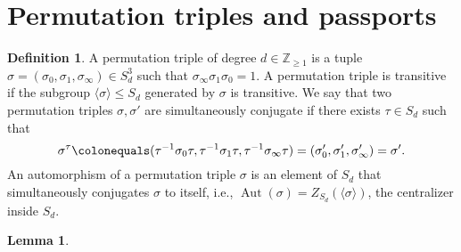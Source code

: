 \documentclass{dcthesis}
\newcommand{\PP}{\mathbb P}
\newcommand{\CC}{\mathbb C}
\newcommand{\QQ}{\mathbb Q}
\newcommand{\ZZ}{\mathbb Z}
\newcommand{\defi}[1]{\textsf{#1}}
\DeclareMathOperator{\Aut}{Aut}
\DeclareMathOperator{\Mon}{Mon}
\DeclareMathOperator{\Gal}{Gal}
\numberwithin{equation}{section}
\newtheorem{lemma}[equation]{Lemma}
\theoremstyle{definition}
\newtheorem{definition}[equation]{Definition}
\theoremstyle{remark}
\begin{document}
{  \section{Permutation triples and passports}{\label{sec:passports}
    \begin{definition}
      \label{def:permutationtriple}
      A \defi{permutation triple} of degree $d \in \ZZ_{\geq 1}$ is a tuple $\sigma =
      (\sigma_0,\sigma_1,\sigma_\infty)\in S_d^3$ such that $\sigma_\infty \sigma_1
      \sigma_0 = 1$.
      A permutation triple is \defi{transitive} if the subgroup
      $\langle \sigma \rangle \leq S_d$ generated by $\sigma$ is transitive.
      We say
      that two permutation triples $\sigma,\sigma'$ are \defi{simultaneously
      conjugate} if there exists $\tau\in S_d$ such that
      \begin{equation}\label{eqn:simconj}
        \sigma^\tau \colonequals
        (\tau^{-1}\sigma_0\tau, \tau^{-1}\sigma_1\tau, \tau^{-1}\sigma_\infty\tau)
        = \left(\sigma'_0,\sigma'_1,\sigma'_\infty\right)
        = \sigma'.
      \end{equation}
      An \defi{automorphism} of a permutation triple $\sigma$ is an element of $S_d$ that
      simultaneously conjugates $\sigma$ to itself, i.e.,
      $\Aut(\sigma)=Z_{S_d}(\langle \sigma \rangle)$, the centralizer inside $S_d$.
    \end{definition}
    \begin{lemma}

\end{lemma}}}
\end{document}
